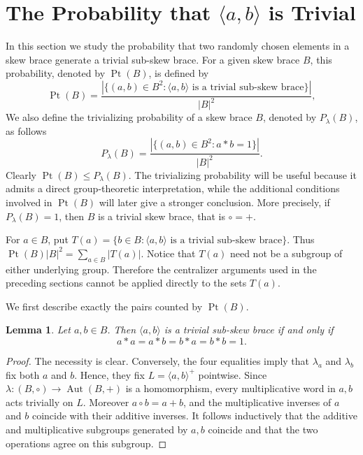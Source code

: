 \documentclass[11pt, oneside]{amsart}
\numberwithin{equation}{section}
\theoremstyle{plain}
\newtheorem{lem}[equation]{Lemma}
\theoremstyle{definition}
\newcommand{\Pt}{\operatorname{Pt} }
\newcommand{\Aut}{\operatorname{Aut} }
\begin{document}



\section{The Probability that $\langle a,b\rangle$ is Trivial}

In this section we study the probability that two randomly chosen elements in a skew brace generate a trivial sub-skew brace. For a given skew brace $B$, this probability, denoted by $\Pt(B)$, is defined by
$$
\Pt(B)=\frac{|\{(a,b)\in B^2:\langle a,b\rangle\text{ is a trivial sub-skew brace}\}|}{|B|^2},
$$
We also define the trivializing  probability of a skew brace $B$, denoted by $P_{\lambda}(B)$, as follows 
$$
P_{\lambda}(B)=\frac{|\{(a,b)\in B^2:a*b= 1\}|}{|B|^2}.
$$
Clearly $\Pt(B)\leqslant P_{\lambda}(B)$. The  trivializing probability will be useful because it admits a direct group-theoretic interpretation, while
the additional conditions involved in $\Pt(B)$ will later give a stronger
conclusion. More precisely, if $P_{\lambda}(B)=1$, then $B$ is a trivial skew brace, that is $\circ = +$.

For $a\in B$, put
$T(a)=\{b\in B:\langle a,b\rangle\text{ is a trivial sub-skew brace}\}$. Thus
$\Pt(B)|B|^2=\sum_{a\in B}|T(a)|$. Notice that $T(a)$ need not be a
subgroup of either underlying group. Therefore the centralizer arguments
used in the preceding sections cannot be applied directly to the sets
$T(a)$.

We first describe exactly the pairs counted by $\Pt(B)$.

\begin{lem}\label{lem:two-generated-trivial}
Let $a,b\in B$. Then $\langle a,b\rangle$ is a trivial sub-skew brace if and only if
$$
a*a=a*b=b*a=b*b= 1.
$$
\end{lem}

\begin{proof}
The necessity is clear. Conversely, the four equalities imply that
$\lambda_a$ and $\lambda_b$ fix both $a$ and $b$. Hence, they fix $L=\langle a,b\rangle^+$ pointwise. Since
$\lambda:(B,\circ)\to\Aut(B,+)$ is a homomorphism, every multiplicative
word in $a,b$ acts trivially on $L$. Moreover $a\circ b=a+b$, and the
multiplicative inverses of $a$ and $b$ coincide with their additive
inverses. It follows inductively that the additive and multiplicative
subgroups generated by $a,b$ coincide and that the two operations agree
on this subgroup.
\end{proof}
\end{document}
